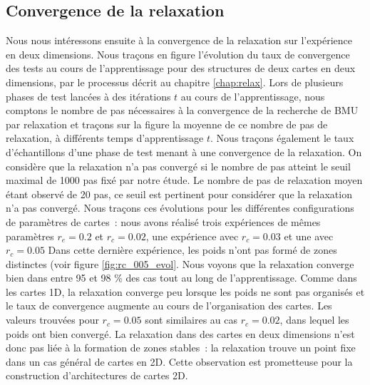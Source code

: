 \documentclass[../main]{subfiles}
\begin{document}

\subsection{Convergence de la relaxation \label{par:conv2D}}

Nous nous intéressons ensuite à la convergence de la relaxation sur l'expérience en deux dimensions. 
Nous traçons en figure \label{fig:relax2D} l'évolution du taux de convergence des tests au cours de l'apprentissage pour des structures de deux cartes en deux dimensions, par le processus décrit au chapitre \ref{chap:relax}. Lors de plusieurs phases de test lancées à des itérations $t$ au cours de l'apprentissage, nous comptons le nombre de pas nécessaires à la convergence de la recherche de BMU par relaxation et traçons sur la figure la moyenne de ce nombre de pas de relaxation, à différents temps d'apprentissage $t$.
Nous traçons également le taux d'échantillons d'une phase de test menant à une convergence de la relaxation. On considère que la relaxation n'a pas convergé si le nombre de pas atteint le seuil maximal de 1000 pas fixé par notre étude. Le nombre de pas de relaxation moyen étant observé de 20 pas, ce seuil est pertinent pour considérer que la relaxation n'a pas convergé.
Nous traçons ces évolutions pour les différentes configurations de paramètres de cartes~: nous avons réalisé trois expériences de mêmes paramètres $r_e=0.2$ et $r_c = 0.02$, une expérience avec $r_c = 0.03$ et une avec $r_c = 0.05$ Dans cette dernière expérience, les poids n'ont pas formé de zones distinctes (voir figure \ref{fig:rc_005_evol}.
Nous voyons que la relaxation converge bien dans entre 95 et 98 \% des cas tout au long de l'apprentissage. Comme dans les cartes 1D, la relaxation converge peu lorsque les poids ne sont pas organisés et le taux de convergence augmente au cours de l'organisation des cartes.
Les valeurs trouvées pour $r_c = 0.05$ sont similaires au cas $r_c = 0.02$, dans lequel les poids ont bien convergé. La relaxation dans des cartes en deux dimensions n'est donc pas liée à la formation de zones stables~: la relaxation trouve un point fixe dans un cas général de cartes en 2D.
Cette observation est prometteuse pour la construction d'architectures de cartes 2D.
\end{document}

